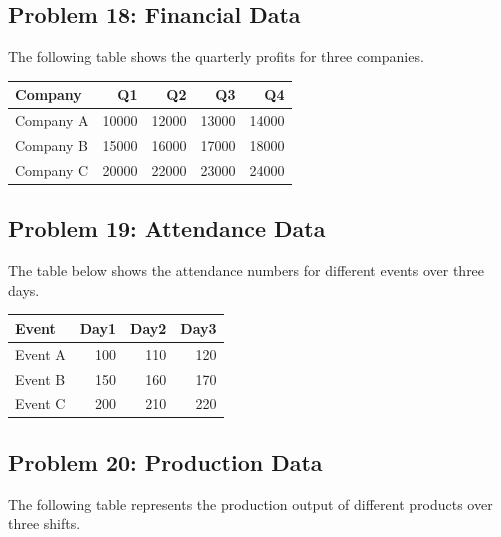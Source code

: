 \documentclass[
  letterpaper,
  DIV=11,
  numbers=noendperiod]{scrreprt}
\begin{document}
\subsection*{Problem 18: Financial
Data}\label{problem-18-financial-data}

The following table shows the quarterly profits for three companies.

\begin{table}
\centering
\begin{tabular}{l|r|r|r|r}
\hline
Company & Q1 & Q2 & Q3 & Q4\\
\hline
Company A & 10000 & 12000 & 13000 & 14000\\
\hline
Company B & 15000 & 16000 & 17000 & 18000\\
\hline
Company C & 20000 & 22000 & 23000 & 24000\\
\hline
\end{tabular}
\end{table}

\subsection*{Problem 19: Attendance
Data}\label{problem-19-attendance-data}

The table below shows the attendance numbers for different events over
three days.

\begin{table}
\centering
\begin{tabular}{l|r|r|r}
\hline
Event & Day1 & Day2 & Day3\\
\hline
Event A & 100 & 110 & 120\\
\hline
Event B & 150 & 160 & 170\\
\hline
Event C & 200 & 210 & 220\\
\hline
\end{tabular}
\end{table}

\subsection*{Problem 20: Production
Data}\label{problem-20-production-data}

The following table represents the production output of different
products over three shifts.
\end{document}
